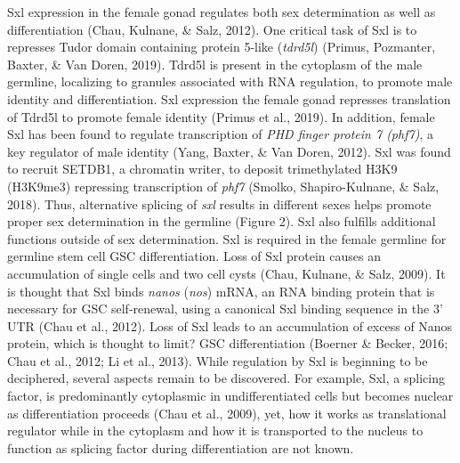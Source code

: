 \documentclass[12pt,oneside]{reedthesis}
\begin{document}
Sxl expression in the female gonad regulates both sex determination as
well as differentiation (Chau, Kulnane, \& Salz, 2012). One critical task of Sxl is to
represses Tudor domain containing protein 5-like (\emph{tdrd5l})
(Primus, Pozmanter, Baxter, \& Van Doren, 2019). Tdrd5l is present in the cytoplasm of the male
germline, localizing to granules associated with RNA regulation, to
promote male identity and differentiation. Sxl expression the female
gonad represses translation of Tdrd5l to promote female identity
(Primus et al., 2019). In addition, female Sxl has been found to regulate
transcription of \emph{PHD finger protein 7 (phf7)}, a key regulator of male
identity (Yang, Baxter, \& Van Doren, 2012). Sxl was found to recruit SETDB1, a chromatin
writer, to deposit trimethylated H3K9 (H3K9me3) repressing transcription
of \emph{phf7} (Smolko, Shapiro-Kulnane, \& Salz, 2018). Thus, alternative splicing of \emph{sxl} results
in different sexes helps promote proper sex determination in the
germline (Figure 2). Sxl also fulfills additional functions outside of
sex determination. Sxl is required in the female germline for germline
stem cell GSC differentiation. Loss of Sxl protein causes an
accumulation of single cells and two cell cysts (Chau, Kulnane, \& Salz, 2009). It is
thought that Sxl binds \emph{nanos} (\emph{nos}) mRNA, an RNA binding protein that
is necessary for GSC self-renewal, using a canonical Sxl binding
sequence in the 3' UTR (Chau et al., 2012). Loss of Sxl leads to an
accumulation of excess of Nanos protein, which is thought to limit? GSC
differentiation (Boerner \& Becker, 2016; Chau et al., 2012; Li et al., 2013). While
regulation by Sxl is beginning to be deciphered, several aspects remain
to be discovered. For example, Sxl, a splicing factor, is predominantly
cytoplasmic in undifferentiated cells but becomes nuclear as
differentiation proceeds (Chau et al., 2009), yet, how it works as
translational regulator while in the cytoplasm and how it is transported
to the nucleus to function as splicing factor during differentiation are
not known.
\end{document}
